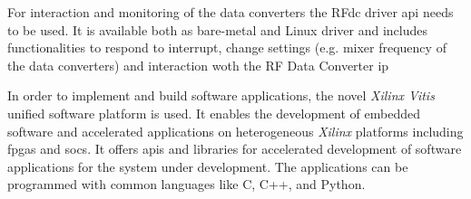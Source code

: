 For interaction and monitoring of the data converters the RFdc driver \gls{api} needs to be used.
It is available both as bare-metal and Linux driver and includes functionalities to respond to interrupt, change settings (e.g. mixer frequency of the data converters) and interaction woth the RF Data Converter \gls{ip}

In order to implement and build software applications, the novel \textit{Xilinx Vitis} unified software platform is used.
It enables the development of embedded software and accelerated applications on heterogeneous \textit{Xilinx} platforms including \glspl{fpga} and \glspl{soc}.
It offers \glspl{api} and libraries for accelerated development of software applications for the system under development.
The applications can be programmed with common languages like C, C++, and Python.
